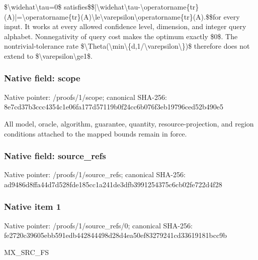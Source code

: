 \documentclass[10pt,a4paper]{article}
\begin{document}
\$\textbackslash{}widehat\textbackslash{}tau=\allowbreak{}0\$ satisfies\newline{}\$\$|\textbackslash{}widehat\textbackslash{}tau-\textbackslash{}operatorname\{tr\}(A)|=\allowbreak{}\textbackslash{}operatorname\{tr\}(A)\textbackslash{}le\textbackslash{}varepsilon\textbackslash{}operatorname\{tr\}(A).\$\$\newline{}for every input. It works at every allowed confidence level,\allowbreak{} dimension,\allowbreak{} and integer query alphabet. Nonnegativity of query cost makes the optimum exactly \$0\$. The nontrivial-tolerance rate \$\textbackslash{}Theta(\textbackslash{}min\textbackslash{}\{d,\allowbreak{}1/\allowbreak{}\textbackslash{}varepsilon\textbackslash{}\})\$ therefore does not extend to \$\textbackslash{}varepsilon\textbackslash{}ge1\$.\par\endgroup

\subsubsection{Native field: scope}
Native pointer: /proofs/1/scope; canonical SHA-256: 8e7cd37b3ccc4354c1e06fa177d57119b0f24cc6b076f3eb19796ced52b490e5

\begingroup\raggedright\sloppy All model,\allowbreak{} oracle,\allowbreak{} algorithm,\allowbreak{} guarantee,\allowbreak{} quantity,\allowbreak{} resource-projection,\allowbreak{} and region conditions attached to the mapped bounds remain in force.\par\endgroup

\subsubsection{Native field: source\_\allowbreak{}refs}
Native pointer: /proofs/1/source\_\allowbreak{}refs; canonical SHA-256: ad9486d8ffa44d7d528fde185cc1a241de3dfb3991254375c6cb02fe722d4f28

\subsubsection{Native item 1}
Native pointer: /proofs/1/source\_\allowbreak{}refs/0; canonical SHA-256: fe2720c39605ebb591edb442844498d28d4ea50ef83279241cd33619181bcc9b

\begingroup\raggedright\sloppy MX\_\allowbreak{}SRC\_\allowbreak{}FS\par\endgroup
\end{document}
